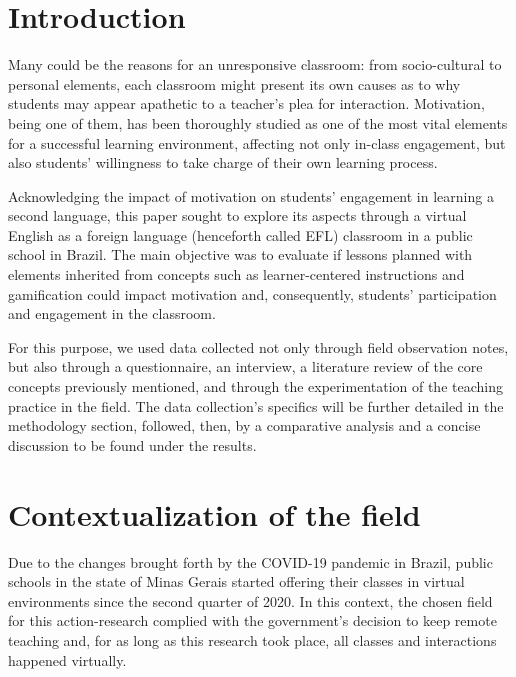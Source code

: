 \documentclass[english]{textolivre}
\begin{document}
\section{Introduction}

Many could be the reasons for an unresponsive classroom: from socio-cultural to personal elements, each classroom might present its own causes as to why students may appear apathetic to a teacher’s plea for interaction. Motivation, being one of them, has been thoroughly studied as one of the most vital elements \cite{brown2000douglas, brown2006principles, harmer2007practice, ryan2009promoting, celce2014teaching} for a successful learning environment, affecting not only in-class engagement, but also students’ willingness to take charge of their own learning process.

Acknowledging the impact of motivation on students’ engagement in learning a second language, this paper sought to explore its aspects through a virtual English as a foreign language (henceforth called EFL) classroom in a public school in Brazil. The main objective was to evaluate if lessons planned with elements inherited from concepts such as learner-centered instructions \cite{felder1996navigating, brown2000douglas} and gamification \cite{deterding2011game, hanus2014assessing} could impact motivation and, consequently, students’ participation and engagement in the classroom.

For this purpose, we used data collected not only through field observation notes, but also through a questionnaire, an interview, a literature review of the core concepts previously mentioned, and through the experimentation of the teaching practice in the field. The data collection’s specifics will be further detailed in the methodology section, followed, then, by a comparative analysis and a concise discussion to be found under the results.

\section{Contextualization of the field}

Due to the changes brought forth by the COVID-19 pandemic in Brazil, public schools in the state of Minas Gerais started offering their classes in virtual environments since the second quarter of 2020. In this context, the chosen field for this action-research complied with the government’s decision to keep remote teaching and, for as long as this research took place, all classes and interactions happened virtually.
\end{document}
